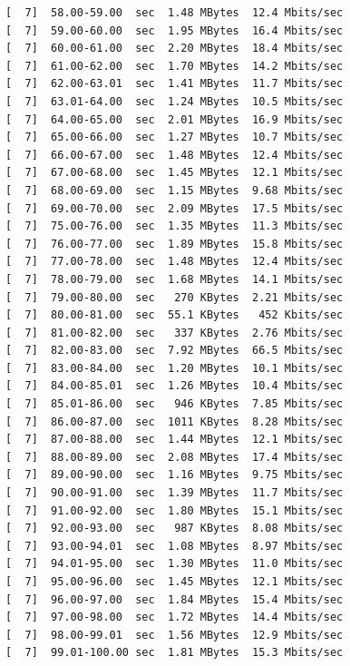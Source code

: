 \documentclass[12pt]{article}
\begin{document}
\begin{enumerate}
\begin{latin}
\begin{Verbatim}
[  7]  58.00-59.00  sec  1.48 MBytes  12.4 Mbits/sec                  
[  7]  59.00-60.00  sec  1.95 MBytes  16.4 Mbits/sec                  
[  7]  60.00-61.00  sec  2.20 MBytes  18.4 Mbits/sec                  
[  7]  61.00-62.00  sec  1.70 MBytes  14.2 Mbits/sec                  
[  7]  62.00-63.01  sec  1.41 MBytes  11.7 Mbits/sec                  
[  7]  63.01-64.00  sec  1.24 MBytes  10.5 Mbits/sec                  
[  7]  64.00-65.00  sec  2.01 MBytes  16.9 Mbits/sec                  
[  7]  65.00-66.00  sec  1.27 MBytes  10.7 Mbits/sec                  
[  7]  66.00-67.00  sec  1.48 MBytes  12.4 Mbits/sec                  
[  7]  67.00-68.00  sec  1.45 MBytes  12.1 Mbits/sec                  
[  7]  68.00-69.00  sec  1.15 MBytes  9.68 Mbits/sec                  
[  7]  69.00-70.00  sec  2.09 MBytes  17.5 Mbits/sec                  
[  7]  75.00-76.00  sec  1.35 MBytes  11.3 Mbits/sec                  
[  7]  76.00-77.00  sec  1.89 MBytes  15.8 Mbits/sec                  
[  7]  77.00-78.00  sec  1.48 MBytes  12.4 Mbits/sec                  
[  7]  78.00-79.00  sec  1.68 MBytes  14.1 Mbits/sec                  
[  7]  79.00-80.00  sec   270 KBytes  2.21 Mbits/sec                  
[  7]  80.00-81.00  sec  55.1 KBytes   452 Kbits/sec                  
[  7]  81.00-82.00  sec   337 KBytes  2.76 Mbits/sec                  
[  7]  82.00-83.00  sec  7.92 MBytes  66.5 Mbits/sec                  
[  7]  83.00-84.00  sec  1.20 MBytes  10.1 Mbits/sec                  
[  7]  84.00-85.01  sec  1.26 MBytes  10.4 Mbits/sec                  
[  7]  85.01-86.00  sec   946 KBytes  7.85 Mbits/sec                  
[  7]  86.00-87.00  sec  1011 KBytes  8.28 Mbits/sec                  
[  7]  87.00-88.00  sec  1.44 MBytes  12.1 Mbits/sec                  
[  7]  88.00-89.00  sec  2.08 MBytes  17.4 Mbits/sec                  
[  7]  89.00-90.00  sec  1.16 MBytes  9.75 Mbits/sec                  
[  7]  90.00-91.00  sec  1.39 MBytes  11.7 Mbits/sec                  
[  7]  91.00-92.00  sec  1.80 MBytes  15.1 Mbits/sec                  
[  7]  92.00-93.00  sec   987 KBytes  8.08 Mbits/sec                  
[  7]  93.00-94.01  sec  1.08 MBytes  8.97 Mbits/sec                  
[  7]  94.01-95.00  sec  1.30 MBytes  11.0 Mbits/sec                  
[  7]  95.00-96.00  sec  1.45 MBytes  12.1 Mbits/sec                  
[  7]  96.00-97.00  sec  1.84 MBytes  15.4 Mbits/sec                  
[  7]  97.00-98.00  sec  1.72 MBytes  14.4 Mbits/sec                  
[  7]  98.00-99.01  sec  1.56 MBytes  12.9 Mbits/sec                  
[  7]  99.01-100.00 sec  1.81 MBytes  15.3 Mbits/sec                  

\end{Verbatim}
\end{latin}
\end{enumerate}
\end{document}
